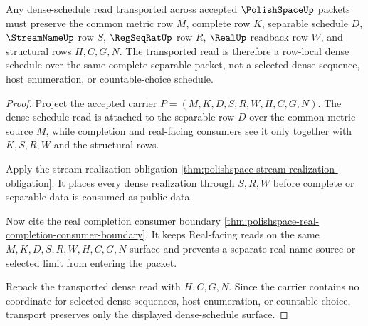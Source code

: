 \begin{theorem}
\label{thm:polishspace-dense-schedule-transport-obligation}
Any dense-schedule read transported across accepted $\PolishSpaceUp$ packets must preserve the common metric row $M$, complete row $K$, separable schedule $D$, $\StreamNameUp$ row $S$, $\RegSeqRatUp$ row $R$, $\RealUp$ readback row $W$, and structural rows $H,C,G,N$. The transported read is therefore a row-local dense schedule over the same complete-separable packet, not a selected dense sequence, host enumeration, or countable-choice schedule.
\end{theorem}
\begin{proof}
Project the accepted carrier $P=(M,K,D,S,R,W,H,C,G,N)$. The dense-schedule read is attached to the separable row $D$ over the common metric source $M$, while completion and real-facing consumers see it only together with $K,S,R,W$ and the structural rows.

Apply the stream realization obligation \autoref{thm:polishspace-stream-realization-obligation}. It places every dense realization through $S,R,W$ before complete or separable data is consumed as public data.

Now cite the real completion consumer boundary \autoref{thm:polishspace-real-completion-consumer-boundary}. It keeps Real-facing reads on the same $M,K,D,S,R,W,H,C,G,N$ surface and prevents a separate real-name source or selected limit from entering the packet.

Repack the transported dense read with $H,C,G,N$. Since the carrier contains no coordinate for selected dense sequences, host enumeration, or countable choice, transport preserves only the displayed dense-schedule surface.
\end{proof}

